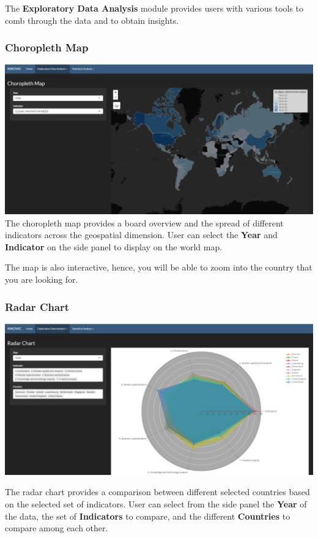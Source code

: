 \documentclass[
]{article}
\begin{document}
The \textbf{Exploratory Data Analysis} module provides users with
various tools to comb through the data and to obtain insights.

\hypertarget{choropleth-map}{%
\subsubsection{Choropleth Map}\label{choropleth-map}}

\includegraphics{./images/choropleth.png} The choropleth map provides a
board overview and the spread of different indicators across the
geospatial dimension. User can select the \textbf{Year} and
\textbf{Indicator} on the side panel to display on the world map.

The map is also interactive, hence, you will be able to zoom into the
country that you are looking for.

\hypertarget{radar-chart}{%
\subsubsection{Radar Chart}\label{radar-chart}}

\includegraphics{./images/radar.png}

The radar chart provides a comparison between different selected
countries based on the selected set of indicators. User can select from
the side panel the \textbf{Year} of the data, the set of
\textbf{Indicators} to compare, and the different \textbf{Countries} to
compare among each other.
\end{document}
